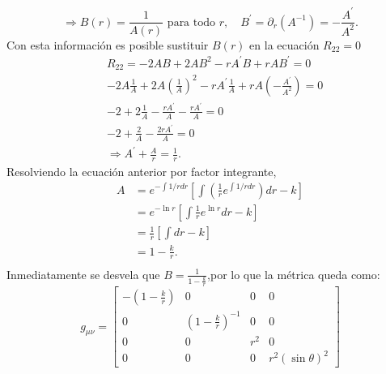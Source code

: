 \begin{equation}
    \Rightarrow B(r)=\frac{1}{A(r)} \text { para todo } r, \quad  B^{\prime}=\partial_r\left(A^{-1}\right)=-\frac{A^{\prime}}{A^2}.
\end{equation}
Con esta información es posible sustituir \( B(r) \) en la ecuación \( R_{22} = 0 \)
\begin{equation}
    \begin{aligned}
         & R_{22}=-2 A B+2 A B^2-r A^{\prime} B+r A B^{\prime}   = 0                                                           \\
         &-2 A \frac{1}{A}+2 A\left(\frac{1}{A}\right)^2-r A^{\prime} \frac{1}{A}+r A\left(-\frac{A^{\prime}}{A^2}\right)=0\\
         & -2 + 2 \frac{1}{A}-\frac{r A^{\prime}}{A}- \frac{r A^{\prime}}{A}=0 \\
            & -2 + \frac{2}{A} - \frac{2r A^{\prime}}{A}=0 \\
            &\Rightarrow  A^{\prime} + \frac{A}{r}=\frac{1}{r}.
    \end{aligned}
    \label{eq:ricci22}
\end{equation}
Resolviendo la ecuación anterior por factor integrante,
\begin{equation}
    \begin{aligned}
        A &= e^{- \int 1/r d r} \left[\int \left(\frac{1}{r}e^{\int 1/r dr } \right)dr - k\right]\\
        &= e^{- \ln r} \left[\int \frac{1}{r} e^{\ln r} dr   - k\right] \\
        &=\frac{1}{r}\left[\int dr - k\right]\\
        &= 1 - \frac{k}{r}. \\
    \end{aligned}
\end{equation}
Inmediatamente se desvela que $B=\frac{1}{1 - \frac{k}{r}}  $,por lo que la métrica queda como:
\begin{equation}
    g_{\mu \nu} =\left[\begin{array}{cccc}
        -\left(1-\frac{k}{r}\right) & 0                                & 0    & 0                   \\
            0             & \left(1-\frac{k}{r}\right)^{-1} & 0    & 0                   \\
            0             & 0                                & r^2 & 0                   \\
            0             & 0                                & 0    & r^2(\sin \theta)^2
        \end{array}\right]
\end{equation}

